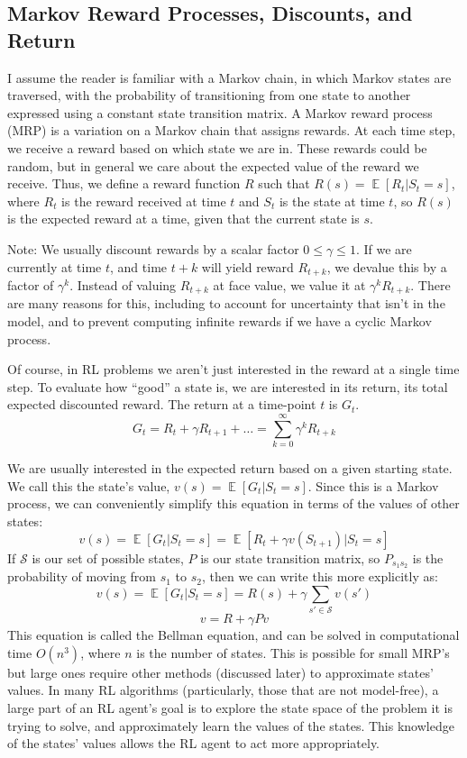 \documentclass{article}
\DeclareMathOperator{\EX}{\mathbb{E}}
\begin{document}
\subsection{Markov Reward Processes, Discounts, and Return}

I assume the reader is familiar with a Markov chain, in which Markov states are traversed, with the probability of transitioning from one state to another expressed using a constant state transition matrix. A Markov reward process (MRP) is a variation on a Markov chain that assigns rewards. At each time step, we receive a reward based on which state we are in. These rewards could be random, but in general we care about the expected value of the reward we receive. Thus, we define a reward function $R$ such that $R(s) = \EX[R_t | S_t = s]$, where $R_t$ is the reward received at time $t$ and $S_t$ is the state at time $t$, so $R(s)$ is the expected reward at a time, given that the current state is $s$.

Note: We usually discount rewards by a scalar factor $0 \leq \gamma \leq 1$. If we are currently at time $t$, and time $t+k$ will yield reward $R_{t+k}$, we devalue this by a factor of $\gamma^k$. Instead of valuing $R_{t+k}$ at face value, we value it at $\gamma^kR_{t+k}$. There are many reasons for this, including to account for uncertainty that isn’t in the model, and to prevent computing infinite rewards if we have a cyclic Markov process.

Of course, in RL problems we aren’t just interested in the reward at a single time step. To evaluate how “good” a state is, we are interested in its return, its total expected discounted reward. The return at a time-point $t$ is $G_t$.
$$G_t = R_t + \gamma R_{t+1} + \ldots = \sum_{k=0}^\infty \gamma^kR_{t+k}$$

We are usually interested in the expected return based on a given starting state. We call this the state’s value, $v(s) = \EX[G_t | S_t = s]$. Since this is a Markov process, we can conveniently simplify this equation in terms of the values of other states:
$$v(s) = \EX[G_t | S_t = s] = \EX[R_t + \gamma v(S_{t+1}) | S_t = s]$$
If $\mathcal{S}$ is our set of possible states, $P$ is our state transition matrix, so $P_{s_1s_2}$ is the probability of moving from $s_1$ to $s_2$, then we can write this more explicitly as:
$$v(s) = \EX[G_t | S_t = s] = R(s) + \gamma\sum_{s'\in \mathcal{S}}v(s')$$
$$v = R + \gamma Pv$$
This equation is called the Bellman equation, and can be solved in computational time $O(n^3)$, where $n$ is the number of states. This is possible for small MRP’s but large ones require other methods (discussed later) to approximate states’ values. In many RL algorithms (particularly, those that are not model-free), a large part of an RL agent’s goal is to explore the state space of the problem it is trying to solve, and approximately learn the values of the states. This knowledge of the states’ values allows the RL agent to act more appropriately.
\end{document}
